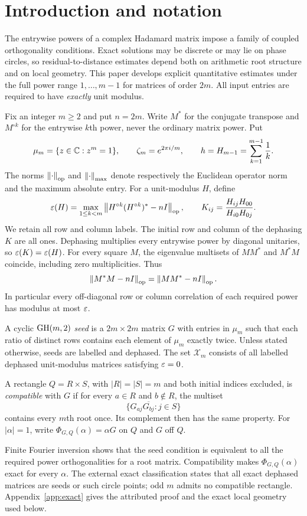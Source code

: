 \section{Introduction and notation}\label{sec:intro}
The entrywise powers of a complex Hadamard matrix impose a family of coupled orthogonality conditions. Exact solutions may be discrete or may lie on phase circles, so residual-to-distance estimates depend both on arithmetic root structure and on local geometry. This paper develops explicit quantitative estimates under the full power range $1,\ldots,m-1$ for matrices of order $2m$. All input entries are required to have \emph{exactly} unit modulus.

Fix an integer $m\ge2$ and put $n=2m$. Write $M^*$ for the conjugate transpose and $M^{\circ k}$ for the entrywise $k$th power, never the ordinary matrix power. Put
\[
 \mu_m=\{z\in\mathbb C:z^m=1\},\qquad \zeta_m=e^{2\pi i/m},\qquad
 h=H_{m-1}=\sum_{k=1}^{m-1}\frac1k.
\]
The norms $\left\lVert\cdot\right\rVert_{\mathrm{op}}$ and $\left\lVert\cdot\right\rVert_{\mathrm{max}}$ denote respectively the Euclidean operator norm and the maximum absolute entry. For a unit-modulus $H$, define
\begin{equation}\label{eq:residual}
 \varepsilon(H)=\max_{1\le k<m}\left\lVert H^{\circ k}(H^{\circ k})^*-nI\right\rVert_{\mathrm{op}},
 \qquad K_{ij}=\frac{H_{ij}H_{00}}{H_{i0}H_{0j}}.
\end{equation}
We retain all row and column labels. The initial row and column of the dephasing $K$ are all ones. Dephasing multiplies every entrywise power by diagonal unitaries, so $\varepsilon(K)=\varepsilon(H)$. For every square $M$, the eigenvalue multisets of $MM^*$ and $M^*M$ coincide, including zero multiplicities. Thus
\begin{equation}\label{eq:column-residual}
 \left\lVert M^*M-nI\right\rVert_{\mathrm{op}}=\left\lVert MM^*-nI\right\rVert_{\mathrm{op}}.
\end{equation}
In particular every off-diagonal row or column correlation of each required power has modulus at most $\varepsilon$.

\begin{definition}
A cyclic $\operatorname{GH}(m,2)$ \emph{seed} is a $2m\times2m$ matrix $G$ with entries in $\mu_m$ such that each ratio of distinct rows contains each element of $\mu_m$ exactly twice. Unless stated otherwise, seeds are labelled and dephased. The set $\mathcal X_m$ consists of all labelled dephased unit-modulus matrices satisfying $\varepsilon=0$.

A rectangle $Q=R\times S$, with $|R|=|S|=m$ and both initial indices excluded, is \emph{compatible} with $G$ if for every $a\in R$ and $b\notin R$, the multiset
\[
 \{G_{aj}\overline{G_{bj}}:j\in S\}
\]
contains every $m$th root once. Its complement then has the same property. For $|\alpha|=1$, write $\Phi_{G,Q}(\alpha)=\alpha G$ on $Q$ and $G$ off $Q$.
\end{definition}
Finite Fourier inversion shows that the seed condition is equivalent to all the required power orthogonalities for a root matrix. Compatibility makes $\Phi_{G,Q}(\alpha)$ exact for every $\alpha$. The external exact classification states that all exact dephased matrices are seeds or such circle points; odd $m$ admits no compatible rectangle. Appendix~\ref{app:exact} gives the attributed proof and the exact local geometry used below.

